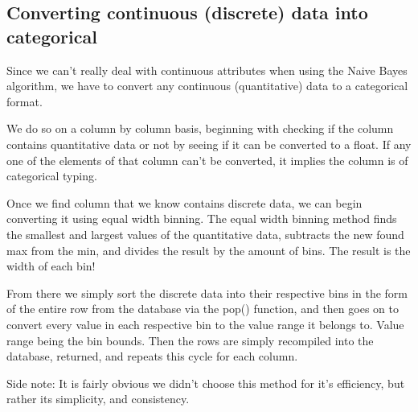 \documentclass[twoside,11pt]{article}
\begin{document}
\subsection{Converting continuous (discrete) data into categorical}

Since we can’t really deal with continuous attributes when using the Naive Bayes algorithm, we have to convert any continuous (quantitative) data to a categorical format. 

We do so on a column by column basis, beginning with checking if the column contains quantitative data or not by seeing if it can be converted to a float. If any one of the elements of that column can’t be converted, it implies the column is of categorical typing. 

Once we find  column that we know contains discrete data, we can begin converting it using equal width binning. The equal width binning method finds the smallest and largest values of the quantitative data, subtracts the new found max from the min, and divides the result by the amount of bins. The result is the width of each bin!

From there we simply sort the discrete data into their respective bins in the form of the entire row from the database via the pop() function, and then goes on to convert every value in each respective bin to the value range it belongs to. Value range being the bin bounds. Then the rows are simply recompiled into the database, returned, and repeats this cycle for each column.

Side note: It is fairly obvious we didn't choose this method for it’s efficiency, but rather its simplicity, and consistency.



\end{document}
